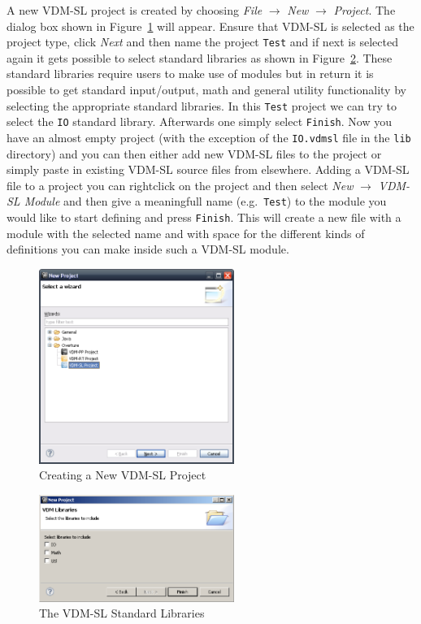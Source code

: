 {A new VDM-SL project is created by choosing \emph{File} $ \rightarrow$
\emph{New} $\rightarrow$ \emph{Project}. The dialog box shown in
Figure~\ref{fig:newOvertureProjectSL} will appear. Ensure that VDM-SL
is selected as the project type, click \emph{Next} and then name the
project \texttt{Test} and if next is selected again it gets possible
to select standard libraries as shown in
Figure~\ref{fig:stdlibs}. These standard libraries require users to
make use of modules but in return it is possible to get standard
input/output, math and general utility functionality by selecting the
appropriate standard libraries. In this \texttt{Test} project we can
try to select the \texttt{IO} standard library. Afterwards one simply
select \texttt{Finish}. Now you have an almost empty project (with the
exception of the \texttt{IO.vdmsl} file in the \texttt{lib} directory)
and you can then
either add new VDM-SL files to the project or simply paste in existing
VDM-SL source files from elsewhere. Adding a VDM-SL file to a project
you can rightclick on the project and then select \emph{New}
$\rightarrow$ \emph{VDM-SL Module} and then give a meaningfull name
(e.g.\ \texttt{Test}) to
the module you would like to start defining and press
\texttt{Finish}. This will create a new file with a module with the
selected name and with space for the different kinds of definitions
you can make inside such a VDM-SL module.

\begin{figure}[!htb]
\begin{center}
  \includegraphics[width=2.5in]{figures/newovertureSLproject}
  \caption[labelInTOC]{Creating a New VDM-SL Project}
  \label{fig:newOvertureProjectSL}
\end{center}
\end{figure}

\begin{figure}[!htb]
\begin{center}
  \includegraphics[width=2.5in]{figures/stdlibs}
  \caption[labelInTOC]{The VDM-SL Standard Libraries}
  \label{fig:stdlibs}
\end{center}
\end{figure}

}

